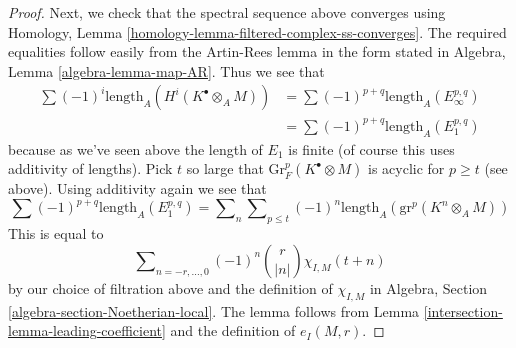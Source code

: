\begin{proof}
\medskip\noindent
Next, we check that the spectral sequence above converges
using Homology, Lemma \ref{homology-lemma-filtered-complex-ss-converges}.
The required equalities follow easily from the Artin-Rees lemma
in the form stated in Algebra, Lemma \ref{algebra-lemma-map-AR}.
Thus we see that
\begin{align*}
\sum (-1)^i\text{length}_A(H^i(K^\bullet \otimes_A M))
& =
\sum (-1)^{p + q} \text{length}_A(E_\infty^{p, q}) \\
& =
\sum (-1)^{p + q} \text{length}_A(E_1^{p, q})
\end{align*}
because as we've seen above the length of $E_1$ is finite
(of course this uses additivity of lengths). Pick $t$ so
large that $\text{Gr}^p_F(K^\bullet \otimes M)$
is acyclic for $p \geq t$ (see above). Using
additivity again we see that
$$
\sum (-1)^{p + q} \text{length}_A(E_1^{p, q}) =
\sum\nolimits_n \sum\nolimits_{p \leq t}
(-1)^n \text{length}_A(\text{gr}^p(K^n \otimes_A M))
$$
This is equal to
$$
\sum\nolimits_{n = -r, \ldots, 0} (-1)^n{r \choose |n|} \chi_{I, M}(t + n)
$$
by our choice of filtration above and the definition of $\chi_{I, M}$ in
Algebra, Section \ref{algebra-section-Noetherian-local}.
The lemma follows from Lemma \ref{intersection-lemma-leading-coefficient}
and the definition of $e_I(M, r)$.
\end{proof}

